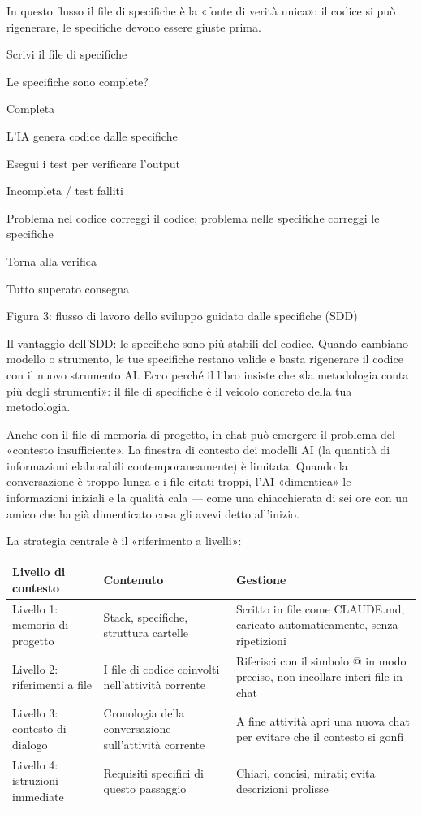 In questo flusso il file di specifiche è la «fonte di verità unica»: il codice si può rigenerare, le specifiche devono essere giuste prima.

Scrivi il file di specifiche

Le specifiche sono complete?

Completa

L'IA genera codice dalle specifiche

Esegui i test per verificare l'output

Incompleta / test falliti

Problema nel codice correggi il codice; problema nelle specifiche correggi le specifiche

Torna alla verifica

Tutto superato consegna

\begin{center}\small\color{gray}Figura 3: flusso di lavoro dello sviluppo guidato dalle specifiche (SDD)\end{center}

Il vantaggio dell'SDD: le specifiche sono più stabili del codice. Quando cambiano modello o strumento, le tue specifiche restano valide e basta rigenerare il codice con il nuovo strumento AI. Ecco perché il libro insiste che «la metodologia conta più degli strumenti»: il file di specifiche è il veicolo concreto della tua metodologia.


Anche con il file di memoria di progetto, in chat può emergere il problema del «contesto insufficiente». La finestra di contesto dei modelli AI (la quantità di informazioni elaborabili contemporaneamente) è limitata. Quando la conversazione è troppo lunga e i file citati troppi, l'AI «dimentica» le informazioni iniziali e la qualità cala — come una chiacchierata di sei ore con un amico che ha già dimenticato cosa gli avevi detto all'inizio.

La strategia centrale è il «riferimento a livelli»:

\begin{center}
\begin{tabularx}{\linewidth}{|X|X|X|}
\hline
\textbf{Livello di contesto} & \textbf{Contenuto} & \textbf{Gestione} \tabularnewline
\hline
Livello 1: memoria di progetto & Stack, specifiche, struttura cartelle & Scritto in file come CLAUDE.md, caricato automaticamente, senza ripetizioni \tabularnewline
Livello 2: riferimenti a file & I file di codice coinvolti nell'attività corrente & Riferisci con il simbolo @ in modo preciso, non incollare interi file in chat \tabularnewline
Livello 3: contesto di dialogo & Cronologia della conversazione sull'attività corrente & A fine attività apri una nuova chat per evitare che il contesto si gonfi \tabularnewline
Livello 4: istruzioni immediate & Requisiti specifici di questo passaggio & Chiari, concisi, mirati; evita descrizioni prolisse \tabularnewline
\hline
\end{tabularx}
\end{center}

